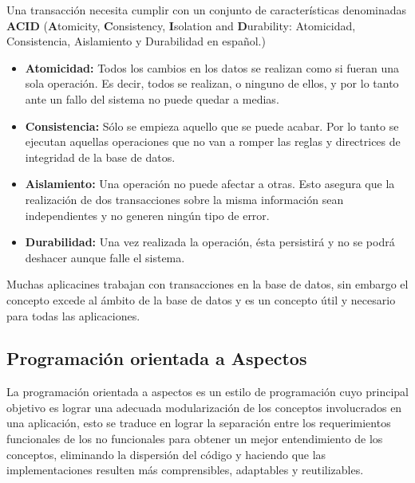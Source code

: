 Una transacción necesita cumplir con un conjunto de características denominadas
{\bf ACID} ({\bf A}tomicity, {\bf C}onsistency, {\bf I}solation and 
{\bf D}urability: Atomicidad, Consistencia, Aislamiento y Durabilidad en
español.)\cite{LA POSTA}

\begin {itemize}

  \item	
  	{\bf Atomicidad:} Todos los cambios en los datos se realizan como si fueran
  	una sola operación.  Es decir, todos se realizan, o ninguno	de ellos, y por
  	lo tanto ante un fallo del sistema no puede quedar a medias.
  
  \item
	{\bf Consistencia:} Sólo se empieza aquello que se puede acabar. Por lo tanto
	se ejecutan aquellas operaciones que no van a romper las reglas y directrices
	de integridad de la base de datos.
  
  \item
	{\bf Aislamiento:} Una operación no puede afectar a otras. Esto asegura que la
	realización de dos transacciones sobre la misma información sean
	independientes y no generen ningún tipo de error.
  	
  \item
	{\bf Durabilidad:} Una vez realizada la operación, ésta persistirá y no se
	podrá deshacer aunque falle el sistema.
	
\end{itemize}	

Muchas aplicacines trabajan con transacciones en la base de datos, sin embargo
el concepto excede al ámbito de la base de datos y es un concepto útil y
necesario para todas las aplicaciones. 



\subsection{Programación orientada a Aspectos}

La programación orientada a aspectos es un estilo de programación cuyo
principal objetivo es lograr una adecuada modularización de los
conceptos involucrados en una aplicación, esto se traduce en lograr la
separación entre los requerimientos funcionales de los no funcionales para
obtener un mejor entendimiento de los conceptos, eliminando la dispersión
del código y haciendo que las implementaciones resulten más
comprensibles, adaptables y reutilizables.	

